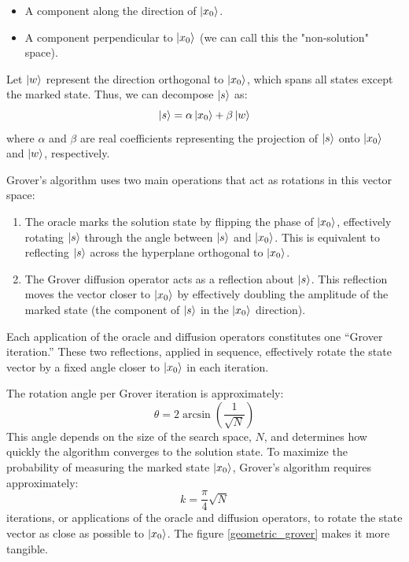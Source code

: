 \documentclass{article}
\begin{document}
		\begin{itemize}
			\item A component along the direction of \( \ket{x_0} \).
			\item A component perpendicular to \( \ket{x_0} \) (we can call this the "non-solution" space).
		\end{itemize}

		Let \( \ket{w} \) represent the direction orthogonal to \( \ket{x_0} \), which spans all states except the marked state. Thus, we can decompose \( \ket{s} \) as:
		\[
		\ket{s} = \alpha \ket{x_0} + \beta \ket{w}
		\]
		where \( \alpha \) and \( \beta \) are real coefficients representing the projection of \( \ket{s} \) onto \( \ket{x_0} \) and \( \ket{w} \), respectively.

		Grover's algorithm uses two main operations that act as rotations in this vector space:

		\begin{enumerate}
			\item The oracle marks the solution state by flipping the phase of \( \ket{x_0} \), effectively rotating \( \ket{s} \) through the angle between \( \ket{s} \) and \( \ket{x_0} \). This is equivalent to reflecting \( \ket{s} \) across the hyperplane orthogonal to \( \ket{x_0} \).

			\item The Grover diffusion operator acts as a reflection about \( \ket{s} \). This reflection moves the vector closer to \( \ket{x_0} \) by effectively doubling the amplitude of the marked state (the component of \( \ket{s} \) in the \( \ket{x_0} \) direction).
		\end{enumerate}

		Each application of the oracle and diffusion operators constitutes one “Grover iteration.” These two reflections, applied in sequence, effectively rotate the state vector by a fixed angle closer to \( \ket{x_0} \) in each iteration.

		The rotation angle per Grover iteration is approximately:
		\[
		\theta = 2 \arcsin\left( \frac{1}{\sqrt{N}} \right)
		\]
		This angle depends on the size of the search space, \( N \), and determines how quickly the algorithm converges to the solution state. To maximize the probability of measuring the marked state \( \ket{x_0} \), Grover’s algorithm requires approximately:
		\[
		k = \frac{\pi}{4} \sqrt{N}
		\]
		iterations, or applications of the oracle and diffusion operators, to rotate the state vector as close as possible to \( \ket{x_0} \). The figure \ref{geometric_grover} makes it more tangible.
\end{document}
